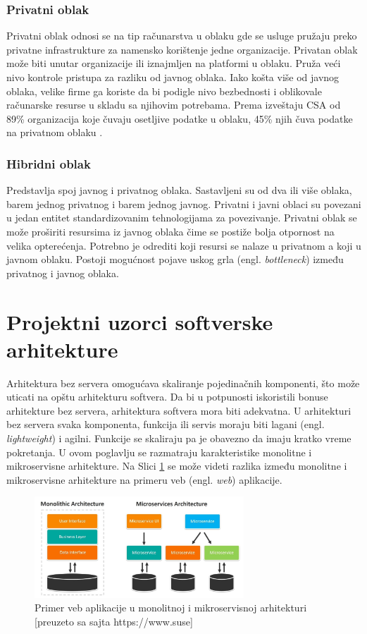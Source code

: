 \documentclass[12pt,oneside]{memoir}
\begin{document}
\subsubsection{Privatni oblak}
Privatni oblak odnosi se na tip računarstva u oblaku gde se usluge pružaju preko privatne infrastrukture za namensko korištenje jedne organizacije. Privatan oblak može biti unutar organizacije ili iznajmljen na platformi u oblaku. Pruža veći nivo kontrole pristupa za razliku od javnog oblaka. Iako košta više od javnog oblaka, velike firme ga koriste da bi podigle nivo bezbednosti i oblikovale računarske resurse u skladu sa njihovim potrebama. Prema izveštaju CSA od 89\% organizacija koje čuvaju osetljive podatke u oblaku, 45\% njih čuva podatke na privatnom oblaku \cite{csa}.


\subsubsection{Hibridni oblak}
Predstavlja spoj javnog i privatnog oblaka. Sastavljeni su od dva ili više oblaka, barem jednog privatnog i barem jednog javnog. Privatni i javni oblaci su povezani u jedan entitet standardizovanim tehnologijama za povezivanje. Privatni oblak se može proširiti resursima iz javnog oblaka čime se postiže bolja otpornost na velika opterećenja. Potrebno je odrediti koji resursi se nalaze u privatnom a koji u javnom oblaku. Postoji mogućnost pojave uskog grla (engl. \emph{bottleneck}) između privatnog i javnog oblaka.


\section{Projektni uzorci softverske arhitekture}
Arhitektura bez servera omogućava skaliranje pojedinačnih komponenti, što može uticati na opštu arhitekturu softvera. Da bi u potpunosti iskoristili bonuse arhitekture bez servera, arhitektura softvera mora biti adekvatna. U arhitekturi bez servera svaka komponenta, funkcija ili servis moraju biti lagani (engl. \emph{lightweight}) i agilni. Funkcije se skaliraju pa je obavezno da imaju kratko vreme pokretanja. U ovom poglavlju se razmatraju karakteristike monolitne i mikroservisne arhitekture. Na Slici \ref{fig:arhitekturniProjektniUzorci} se može videti razlika između monolitne i mikroservisne arhitekture na primeru veb (engl. \emph{web}) aplikacije.

\begin{figure}[!ht]
  \centering
  \includegraphics[width=0.7\textwidth]{Slika 6.jpg}
  \caption{Primer veb aplikacije u monolitnoj i mikroservisnoj arhitekturi\\\footnotesize[preuzeto sa sajta https://www.suse]}
  \label{fig:arhitekturniProjektniUzorci}
\end{figure}
\end{document}
